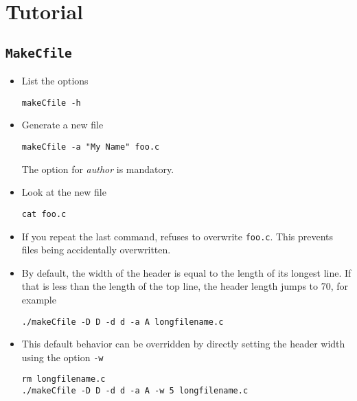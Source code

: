 \documentclass[a4paper, english]{article}
\begin{document}
\section{Tutorial}
\subsection{\texttt{MakeCfile}}
\begin{itemize}
\item List the options
\begin{verbatim}
makeCfile -h
\end{verbatim}
\item Generate a new file
\begin{verbatim}
makeCfile -a "My Name" foo.c
\end{verbatim}
The  option for \emph{author} is mandatory.
\item Look at the new file
\begin{verbatim}
cat foo.c
\end{verbatim}
\item If you repeat the last command,  refuses to
  overwrite \texttt{foo.c}. This prevents files being accidentally
  overwritten.
\item By default, the width of the header is equal to the length of
  its longest line. If that is less than the length of the top line,
  the header length jumps to 70, for example
\begin{verbatim}
./makeCfile -D D -d d -a A longfilename.c
\end{verbatim}
\item This default behavior can be overridden by directly setting the header
  width using the option \texttt{-w}
\begin{verbatim}
rm longfilename.c
./makeCfile -D D -d d -a A -w 5 longfilename.c
\end{verbatim}
\end{itemize}
\end{document}
